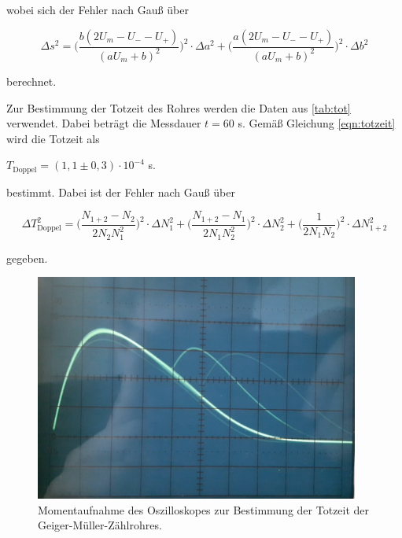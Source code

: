 wobei sich der Fehler nach Gauß über

\begin{equation}
    \Delta s^2 = \bigg( \dfrac{b\left(2 U_m - U_- -U_+ \right)}{\left(a U_m + b \right)^2} \bigg)^2 \cdot \Delta a^2 + \bigg( \dfrac{a\left(2U_m - U_- - U_+ \right)}{\left(a U_m + b \right)^2} \bigg)^2 \cdot \Delta b^2
\end{equation}

berechnet.




Zur Bestimmung der Totzeit des Rohres werden die Daten aus \autoref{tab:tot} verwendet.
Dabei beträgt die Messdauer $t = 60$ s.
Gemäß Gleichung \eqref{eqn:totzeit} wird die Totzeit als

\begin{center}
    $T_\text{Doppel} = (1,1 \pm 0,3) \cdot 10^{-4}$ s.
\end{center}

bestimmt. Dabei ist der Fehler nach Gauß über

\begin{equation}
    \Delta T_\text{Doppel}^2 = \bigg( \dfrac{N_{1+2} - N_2}{2 N_2 N_1^2} \bigg)^2 \cdot \Delta N_1^2 + \bigg( \dfrac{N_{1+2} - N_1}{2 N_1 N_2^2}  \bigg)^2 \cdot \Delta N_2^2 + \bigg( \dfrac{1}{2 N_1 N_2} \bigg)^2 \cdot \Delta N_{1+2}^2
\end{equation}

gegeben.

\begin{figure}
  \centering
  \includegraphics[width=0.95\textwidth]{content/osz.png}
  \caption{Momentaufnahme des Oszilloskopes zur Bestimmung der Totzeit der Geiger-Müller-Zählrohres.}
  \label{fig:osz}
\end{figure}

